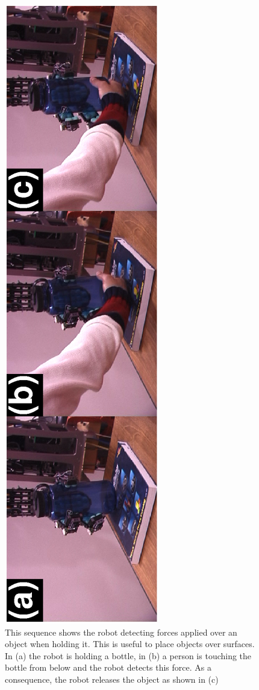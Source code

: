 \begin{figure}[htbp]
\centerline{
\includegraphics[height=\columnwidth, angle=270 ]{./figures/SeqHandDelivery.eps}
} \caption[Detection of forces applied to an object held by the
robot]{This sequence shows the robot detecting forces applied over
an object when holding it. This is useful to place objects over
surfaces. In (a) the robot is holding a bottle, in (b) a person is
touching the bottle from below and the robot detects this force.
As a consequence, the robot releases the object as shown in (c)}
\label{fig:landing}
\end{figure}

